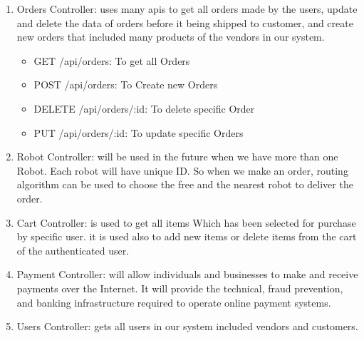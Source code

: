\begin{enumerate}
    \item Orders Controller: uses many apis to get all orders made by the users, update and delete the data of orders before it being shipped to customer, and create new orders that included many products of the vendors in our system.
    \begin{itemize}
    \item GET /api/orders: To get all Orders
    \item POST /api/orders: To Create new Orders
     \item DELETE /api/orders/:id: To delete specific Order
     \item PUT /api/orders/:id: To update specific Orders
     \newline
    \end{itemize} 
    
    \item Robot Controller: will be used in the future when we have more than one Robot. Each robot will have unique ID. So when we make an order, routing algorithm can be used to choose the free and the nearest robot to deliver the order.\newline
    
    \item Cart Controller: is used to get all items Which has been selected for purchase by specific user. it is used also to add new items or delete items from the cart of the authenticated user. \newline

    \item Payment Controller: will allow individuals and businesses to make and receive payments over the Internet. It will provide the technical, fraud prevention, and banking infrastructure required to operate online payment systems.\newline

    \item Users Controller: gets all users in our system included vendors and customers.\newline
    

\end{enumerate}
